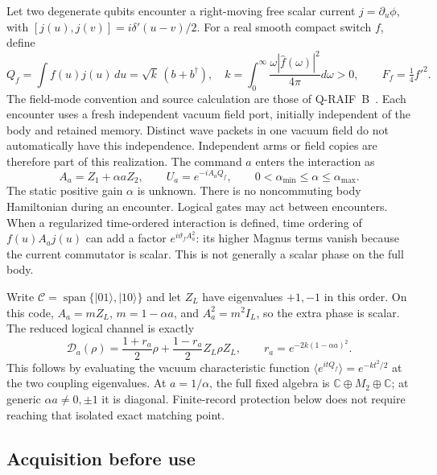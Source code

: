 \documentclass[11pt]{article}
\theoremstyle{definition}
\theoremstyle{remark}
\begin{document}
Let two degenerate qubits encounter a right-moving free scalar current
$j=\partial_u\phi$, with $[j(u),j(v)]=i\delta'(u-v)/2$.
For a real smooth compact switch $f$, define
\begin{equation}
 Q_f=\int f(u)j(u)\,du=\sqrt{k}\,(b+b^\dagger),\quad
 k=\int_0^\infty\frac{\omega|\hat f(\omega)|^2}{4\pi}d\omega>0,
 \qquad F_f=\tfrac14 f'^2.
 \label{eq:quantum_field}
\end{equation}
The field-mode convention and source calculation are those of
Q-RAIF~B~\cite{QRAIFB}. Each encounter uses a fresh independent vacuum field
port, initially independent of the body and retained memory. Distinct
wave packets in one vacuum field do not automatically have this independence.
Independent arms or field copies are therefore part of this realization.
The command $a$ enters the interaction as
\begin{equation}
 A_a=Z_1+\alpha aZ_2,\qquad
 U_a=e^{-iA_aQ_f},\qquad
 0<\alpha_{\min}\le\alpha\le\alpha_{\max}.
 \label{eq:programmable_noise}
\end{equation}
The static positive gain $\alpha$ is unknown. There is no noncommuting body
Hamiltonian during an encounter. Logical gates may act between encounters.
When a regularized time-ordered interaction is defined,
time ordering of $f(u)A_aj(u)$ can add a factor $e^{i\vartheta_f A_a^2}$:
its higher Magnus terms vanish because the current commutator is scalar.
This is not generally a scalar phase on the full body.

Write $\mathcal C=\operatorname{span}\{|01\rangle,|10\rangle\}$ and let
$Z_L$ have eigenvalues $+1,-1$ in this order. On this code,
$A_a=mZ_L$, $m=1-\alpha a$, and $A_a^2=m^2I_L$, so the extra phase is scalar.
The reduced logical channel is exactly
\begin{equation}
 \mathcal D_a(\rho)=\frac{1+r_a}{2}\rho+
       \frac{1-r_a}{2}Z_L\rho Z_L,
 \qquad r_a=e^{-2k(1-\alpha a)^2}.
 \label{eq:learned_dephasing}
\end{equation}
This follows by evaluating the vacuum characteristic function
$\langle e^{itQ_f}\rangle=e^{-kt^2/2}$ at the two coupling eigenvalues.
At $a=1/\alpha$, the full fixed algebra is
$\mathbb C\oplus M_2\oplus\mathbb C$; at generic $\alpha a\ne0,\pm1$
it is diagonal. Finite-record protection below does not require reaching
that isolated exact matching point.

\subsection{Acquisition before use}
\end{document}
